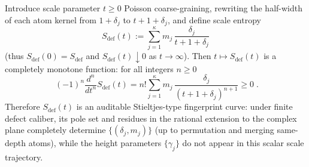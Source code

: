 \begin{proposition}\label{prop:xi-defect-entropy-scale-fingerprint-stieltjes}
Introduce scale parameter \(t\ge 0\) Poisson coarse-graining, rewriting the half-width of each atom kernel from \(1+\delta_j\) to \(t+1+\delta_j\), and define scale entropy
\begin{equation}\label{eq:xi-defect-entropy-scale-curve}
\boxed{\;
S_{\mathrm{def}}(t):=\sum_{j=1}^{\kappa}m_j\,\frac{\delta_j}{t+1+\delta_j}\;}
\end{equation}
(thus \(S_{\mathrm{def}}(0)=S_{\mathrm{def}}\) and \(S_{\mathrm{def}}(t)\downarrow 0\) as \(t\to\infty\)).
Then \(t\mapsto S_{\mathrm{def}}(t)\) is a completely monotone function: for all integers \(n\ge 0\)
\begin{equation}\label{eq:xi-defect-entropy-scale-complete-monotone}
\boxed{\;
(-1)^n\frac{d^n}{dt^n}S_{\mathrm{def}}(t)
=n!\sum_{j=1}^{\kappa}m_j\,\frac{\delta_j}{(t+1+\delta_j)^{n+1}}
\ge 0\; }.
\end{equation}
Therefore \(S_{\mathrm{def}}(t)\) is an auditable Stieltjes-type fingerprint curve: under finite defect caliber,
its pole set and residues in the rational extension to the complex plane completely determine \(\{(\delta_j,m_j)\}\) (up to permutation and merging same-depth atoms),
while the height parameters \(\{\gamma_j\}\) do not appear in this scalar scale trajectory.
\end{proposition}


